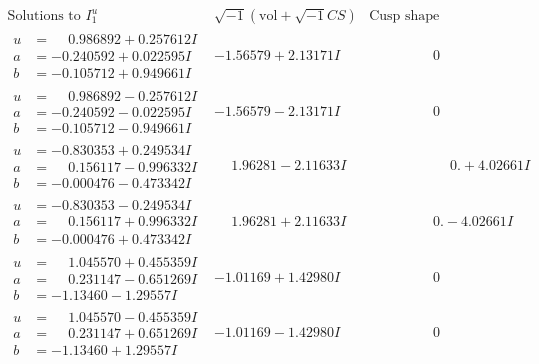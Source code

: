 \documentclass[1p]{elsarticle_modified}
\theoremstyle{definition}
\newcommand{\I}{\sqrt{-1}}
\begin{document}
$$\begin{array}{c|c|c}  
\text{Solutions to }I^u_{1}& \I (\text{vol} + \sqrt{-1}CS) & \text{Cusp shape}\\
 \hline 
\begin{aligned}
u &= \phantom{-}0.986892 + 0.257612 I \\
a &= -0.240592 + 0.022595 I \\
b &= -0.105712 + 0.949661 I\end{aligned}
 & -1.56579 + 2.13171 I & \phantom{-0.000000 } 0 \\ \hline\begin{aligned}
u &= \phantom{-}0.986892 - 0.257612 I \\
a &= -0.240592 - 0.022595 I \\
b &= -0.105712 - 0.949661 I\end{aligned}
 & -1.56579 - 2.13171 I & \phantom{-0.000000 } 0 \\ \hline\begin{aligned}
u &= -0.830353 + 0.249534 I \\
a &= \phantom{-}0.156117 - 0.996332 I \\
b &= -0.000476 - 0.473342 I\end{aligned}
 & \phantom{-}1.96281 - 2.11633 I & \phantom{-0.000000 -}0. + 4.02661 I \\ \hline\begin{aligned}
u &= -0.830353 - 0.249534 I \\
a &= \phantom{-}0.156117 + 0.996332 I \\
b &= -0.000476 + 0.473342 I\end{aligned}
 & \phantom{-}1.96281 + 2.11633 I & \phantom{-0.000000 } 0. - 4.02661 I \\ \hline\begin{aligned}
u &= \phantom{-}1.045570 + 0.455359 I \\
a &= \phantom{-}0.231147 - 0.651269 I \\
b &= -1.13460 - 1.29557 I\end{aligned}
 & -1.01169 + 1.42980 I & \phantom{-0.000000 } 0 \\ \hline\begin{aligned}
u &= \phantom{-}1.045570 - 0.455359 I \\
a &= \phantom{-}0.231147 + 0.651269 I \\
b &= -1.13460 + 1.29557 I\end{aligned}
 & -1.01169 - 1.42980 I & \phantom{-0.000000 } 0 \\ \hline\begin{aligned}

\end{aligned}
\end{array}$$
\end{document}
